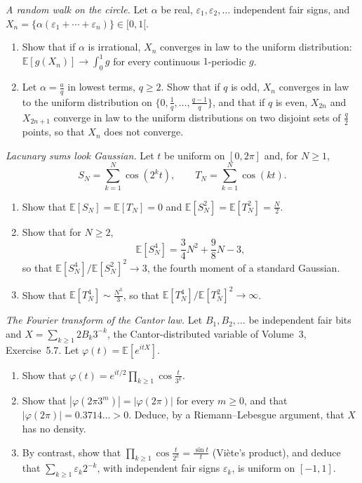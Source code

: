 \begin{exercise}[$\star\star$]\label{pb:circlewalk}
\emph{A random walk on the circle.} Let $\alpha$ be real, $\varepsilon_1,\varepsilon_2,\dots$ independent fair signs, and
$X_n=\{\alpha(\varepsilon_1+\cdots+\varepsilon_n)\}\in[0,1[$.
\begin{enumerate}[label=(\alph*)]
\item Show that if $\alpha$ is irrational, $X_n$ converges in law to the uniform distribution: $\mathbb E[g(X_n)]\to\int_0^1g$ for every
continuous $1$-periodic $g$.
\item Let $\alpha=\frac aq$ in lowest terms, $q\ge2$. Show that if $q$ is odd, $X_n$ converges in law to the uniform distribution on
$\{0,\frac1q,\dots,\frac{q-1}q\}$, and that if $q$ is even, $X_{2n}$ and $X_{2n+1}$ converge in law to the uniform distributions on two
disjoint sets of $\frac q2$ points, so that $X_n$ does not converge.
\end{enumerate}
\end{exercise}

\begin{exercise}[$\star\star\star$]\label{pb:kac}
\emph{Lacunary sums look Gaussian.} Let $t$ be uniform on $[0,2\pi]$ and, for $N\ge1$,
\[
S_N=\sum_{k=1}^N\cos(2^kt),\qquad T_N=\sum_{k=1}^N\cos(kt).
\]
\begin{enumerate}[label=(\alph*)]
\item Show that $\mathbb E[S_N]=\mathbb E[T_N]=0$ and $\mathbb E[S_N^2]=\mathbb E[T_N^2]=\frac N2$.
\item Show that for $N\ge2$,
\[
\mathbb E[S_N^4]=\frac34N^2+\frac98N-3,
\]
so that $\mathbb E[S_N^4]/\mathbb E[S_N^2]^2\to3$, the fourth moment of a standard Gaussian.
\item Show that $\mathbb E[T_N^4]\sim\frac{N^3}3$, so that $\mathbb E[T_N^4]/\mathbb E[T_N^2]^2\to\infty$.
\end{enumerate}
\end{exercise}

\begin{exercise}[$\star\star$]\label{pb:cantor}
\emph{The Fourier transform of the Cantor law.} Let $B_1,B_2,\dots$ be independent fair bits and $X=\sum_{k\ge1}2B_k3^{-k}$, the
Cantor-distributed variable of Volume~3, Exercise~5.7. Let $\varphi(t)=\mathbb E[e^{itX}]$.
\begin{enumerate}[label=(\alph*)]
\item Show that $\varphi(t)=e^{it/2}\prod_{k\ge1}\cos\frac t{3^k}$.
\item Show that $|\varphi(2\pi3^m)|=|\varphi(2\pi)|$ for every $m\ge0$, and that $|\varphi(2\pi)|=0.3714\ldots>0$. Deduce, by a
Riemann--Lebesgue argument, that $X$ has no density.
\item By contrast, show that $\prod_{k\ge1}\cos\frac t{2^k}=\frac{\sin t}t$ (Viète's product), and deduce that $\sum_{k\ge1}\varepsilon_k2^{-k}$, with
independent fair signs $\varepsilon_k$, is uniform on $[-1,1]$.
\end{enumerate}
\end{exercise}

